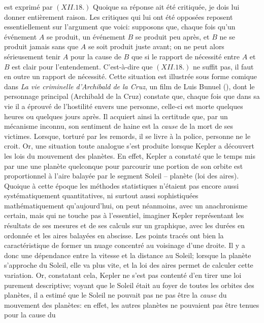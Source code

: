 est exprim\'e par $(XII.18.)$ Quoique sa r\'eponse ait \'et\'e critiqu\'ee, 
je dois lui donner enti\`erement raison. Les critiques qui lui ont \'et\'e 
oppos\'ees reposent essentiellement sur l'argument que voici: 
supposons que, chaque fois qu'un \'ev\'enement $A$ se produit, un 
\'ev\'enement $B$ se produit peu apr\`es, et $B$ ne se produit jamais 
sans que $A$ se soit produit juste avant; on ne peut alors 
s\'erieusement tenir $A$ pour la cause de $B$ que si le rapport de 
n\'ecessit\'e entre $A$ et $B$ est clair pour l'entendement. 
C'est-\`a-dire que $(XII.18.)$ ne suffit pas, il faut en outre un rapport 
de n\'ecessit\'e. Cette situation est illustr\'ee sous forme comique 
dans {\it La vie criminelle d'Archibald de la Cruz}, un film de Luis 
Bunuel ({}), dont le personnage principal (Archibald de 
la Cruz) constate que, chaque fois que dans sa vie il a \'eprouv\'e de
l'hostilit\'e envers une personne, celle-ci est morte quelques heures
ou quelques jours apr\`es. Il acquiert ainsi la certitude que, par un 
m\'ecanisme inconnu, son sentiment de haine est la {\it cause} de la 
mort de ses victimes. Lorsque, tortur\'e par les remords, il se livre
\`a la police, personne ne le croit. Or, une situation toute analogue
s'est produite lorsque Kepler a d\'ecouvert les lois du mouvement des 
plan\`etes. En effet, Kepler a constat\'e que le temps mis par une une 
plan\`ete quelconque pour parcourir une portion de son orbite est 
proportionnel \`a l'aire balay\'ee par le segment Soleil -- plan\`ete 
(loi des aires). Quoique \`a cette \'epoque les m\'ethodes
statistiques n'\'etaient pas encore aussi syst\'ematiquement 
quantitatives, ni surtout aussi sophistiqu\'ees math\'ematiquement 
qu'aujourd'hui, on peut n\'eanmoins, avec un anachronisme certain, mais 
qui ne touche pas \`a l'essentiel, imaginer Kepler repr\'esentant les 
r\'esultats de ses mesures et de ses calculs sur un graphique, avec les 
dur\'ees en ordonn\'ee et les aires balay\'ees en abscisse. Les 
points trac\'es ont bien la caract\'eristique de former un nuage 
concentr\'e au voisinage d'une droite. Il y a donc une d\'ependance 
entre la vitesse et la distance au Soleil; lorsque la plan\`ete s'approche 
du Soleil, elle va plus vite, et la loi des aires permet de calculer cette 
variation. 
\medskip
Or, constatant cela, Kepler ne s'est pas content\'e d'en tirer une loi 
purement descriptive; voyant que le Soleil \'etait au foyer de toutes
les orbites des plan\`etes, il a estim\'e que le Soleil ne pouvait pas ne 
pas \^etre la {\it cause} du mouvement des plan\`etes: en effet, les 
autres plan\`etes ne pouvaient pas \^etre tenues pour la cause du 
